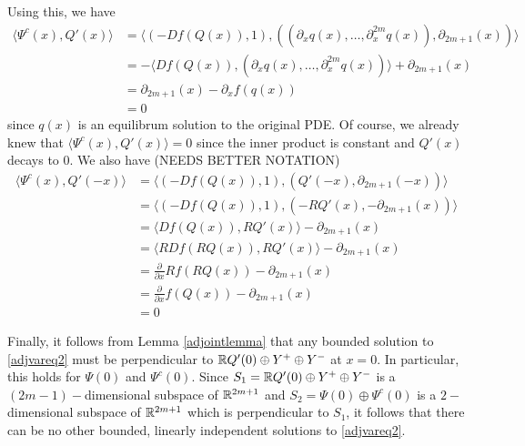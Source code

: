 \documentclass[thesis.tex]{subfiles}
\begin{document}
Using this, we have
\begin{align*}
\langle \Psi^c(x), Q'(x) \rangle 
&= \langle (-Df(Q(x)), 1), ((\partial_x q(x), \dots, \partial_x^{2m} q(x)), \partial_{2m+1}(x)) \rangle \\
&= -\langle Df(Q(x)), (\partial_x q(x), \dots, \partial_x^{2m} q(x)) \rangle + \partial_{2m+1}(x) \\
&= \partial_{2m+1}(x) - \partial_x f(q(x)) \\
&= 0
\end{align*}
since $q(x)$ is an equilibrum solution to the original PDE. Of course, we already knew that $\langle \Psi^c(x), Q'(x) \rangle = 0$ since the inner product is constant and $Q'(x)$ decays to 0. We also have (NEEDS BETTER NOTATION)
\begin{align*}
\langle \Psi^c(x), Q'(-x) \rangle 
&= \langle (-Df(Q(x)), 1), (Q'(-x), \partial_{2m+1}(-x)) \rangle \\
&= \langle (-Df(Q(x)), 1), (-RQ'(x), -\partial_{2m+1}(x)) \rangle \\
&= \langle Df(Q(x)), RQ'(x) \rangle - \partial_{2m+1}(x) \\
&= \langle R Df(R Q(x)), RQ'(x) \rangle - \partial_{2m+1}(x) \\
&= \frac{\partial}{\partial x} R f(R Q(x)) - \partial_{2m+1}(x) \\
&= \frac{\partial}{\partial x} f(Q(x)) - \partial_{2m+1}(x) \\
&= 0
\end{align*}

Finally, it follows from Lemma \ref{adjointlemma} that any bounded solution to \eqref{adjvareq2} must be perpendicular to $\mathbb{R} Q'(0) \oplus Y^+ \oplus Y^-$ at $x = 0$. In particular, this holds for $\Psi(0)$ and $\Psi^c(0)$. Since $S_1 = \mathbb{R} Q'(0) \oplus Y^+ \oplus Y^-$ is a $(2m-1)-$dimensional subspace of $\mathbb{R}^{2m+1}$ and $S_2 = \Psi(0) \oplus \Psi^c(0)$ is a $2-$dimensional subspace of $\mathbb{R}^{2m+1}$ which is perpendicular to $S_1$, it follows that there can be no other bounded, linearly independent solutions to \eqref{adjvareq2}.


\iffulldocument\else
	
	
\fi
\end{document}
